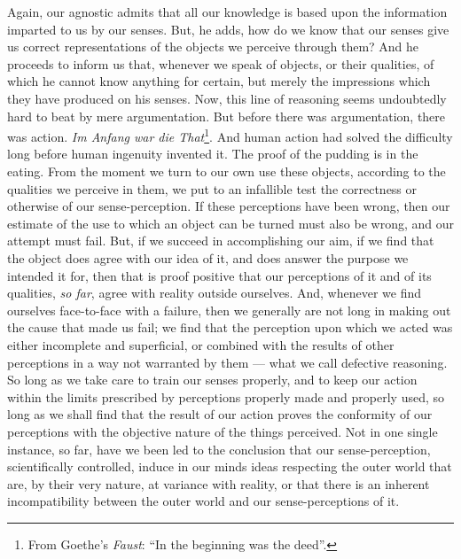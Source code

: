 Again, our agnostic admits that all our knowledge is based upon the
information imparted to us by our senses. But, he adds, how do we know that
our senses give us correct representations of the objects we perceive through
them? And he proceeds to inform us that, whenever we speak of objects, or
their qualities, of which he cannot know anything for certain, but merely the
impressions which they have produced on his senses. Now, this line of
reasoning seems undoubtedly hard to beat by mere argumentation. But before
there was argumentation, there was action. \emph{Im Anfang war die
That}\footnote{From Goethe's \emph{Faust}: ``In the beginning was the deed''.}.
And human action had solved the difficulty long before human ingenuity invented
it. The proof of the pudding is in the eating. From the moment we turn to our
own use these objects, according to the qualities we perceive in them, we put
to an infallible test the correctness or otherwise of our sense-perception. If
these perceptions have been wrong, then our estimate of the use to which an
object can be turned must also be wrong, and our attempt must fail. But, if we
succeed in accomplishing our aim, if we find that the object does agree with our
idea of it, and does answer the purpose we intended it for, then that is proof
positive that our perceptions of it and of its qualities, \emph{so far}, agree
with reality outside ourselves. And, whenever we find ourselves face-to-face
with a failure, then we generally are not long in making out the cause that made
us fail; we find that the perception upon which we acted was either incomplete
and superficial, or combined with the results of other perceptions in a way
not warranted by them — what we call defective reasoning. So long as we take
care to train our senses properly, and to keep our action within the limits
prescribed by perceptions properly made and properly used, so long as we shall
find that the result of our action proves the conformity of our perceptions
with the objective nature of the things perceived. Not in one single instance,
so far, have we been led to the conclusion that our sense-perception,
scientifically controlled, induce in our minds ideas respecting the outer world
that are, by their very nature, at variance with reality, or that there is an
inherent incompatibility between the outer world and our sense-perceptions of
it.

